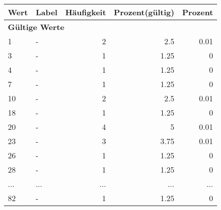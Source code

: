      \begin{longtable}{lXrrr}
     \toprule
     \textbf{Wert} & \textbf{Label} & \textbf{Häufigkeit} & \textbf{Prozent(gültig)} & \textbf{Prozent} \\
     \endhead
     \midrule
     \multicolumn{5}{l}{\textbf{Gültige Werte}}\\
        1 & \multicolumn{1}{X}{-} & %
          \num{2} &
          \num[round-mode=places,round-precision=2]{2,5} &
          \num[round-mode=places,round-precision=2]{0,01} \\
        3 & \multicolumn{1}{X}{-} & %
          \num{1} &
          \num[round-mode=places,round-precision=2]{1,25} &
          \num[round-mode=places,round-precision=2]{0} \\
        4 & \multicolumn{1}{X}{-} & %
          \num{1} &
          \num[round-mode=places,round-precision=2]{1,25} &
          \num[round-mode=places,round-precision=2]{0} \\
        7 & \multicolumn{1}{X}{-} & %
          \num{1} &
          \num[round-mode=places,round-precision=2]{1,25} &
          \num[round-mode=places,round-precision=2]{0} \\
        10 & \multicolumn{1}{X}{-} & %
          \num{2} &
          \num[round-mode=places,round-precision=2]{2,5} &
          \num[round-mode=places,round-precision=2]{0,01} \\
        18 & \multicolumn{1}{X}{-} & %
          \num{1} &
          \num[round-mode=places,round-precision=2]{1,25} &
          \num[round-mode=places,round-precision=2]{0} \\
        20 & \multicolumn{1}{X}{-} & %
          \num{4} &
          \num[round-mode=places,round-precision=2]{5} &
          \num[round-mode=places,round-precision=2]{0,01} \\
        23 & \multicolumn{1}{X}{-} & %
          \num{3} &
          \num[round-mode=places,round-precision=2]{3,75} &
          \num[round-mode=places,round-precision=2]{0,01} \\
        26 & \multicolumn{1}{X}{-} & %
          \num{1} &
          \num[round-mode=places,round-precision=2]{1,25} &
          \num[round-mode=places,round-precision=2]{0} \\
        28 & \multicolumn{1}{X}{-} & %
          \num{1} &
          \num[round-mode=places,round-precision=2]{1,25} &
          \num[round-mode=places,round-precision=2]{0} \\
       ... & ... & ... & ... & ... \\
        82 & \multicolumn{1}{X}{-} & %
          \num{1} &
          \num[round-mode=places,round-precision=2]{1,25} &
          \num[round-mode=places,round-precision=2]{0} \\


\end{longtable}
